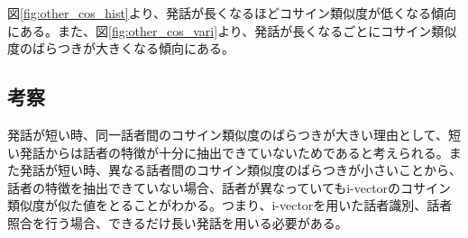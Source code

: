 図\ref{fig:other_cos_hist}より、発話が長くなるほどコサイン類似度が低くなる傾向にある。また、図\ref{fig:other_cos_vari}より、発話が長くなるごとにコサイン類似度のばらつきが大きくなる傾向にある。\par

\subsection{考察}
発話が短い時、同一話者間のコサイン類似度のばらつきが大きい理由として、短い発話からは話者の特徴が十分に抽出できていないためであると考えられる。また発話が短い時、異なる話者間のコサイン類似度のばらつきが小さいことから、話者の特徴を抽出できていない場合、話者が異なっていてもi-vectorのコサイン類似度が似た値をとることがわかる。つまり、i-vectorを用いた話者識別、話者照合を行う場合、できるだけ長い発話を用いる必要がある。
